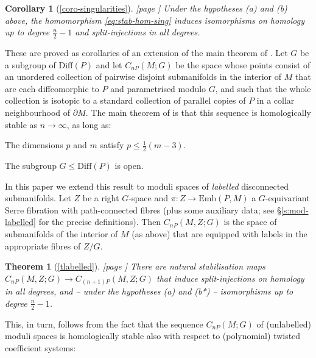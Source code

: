 \documentclass[reqno,a4paper]{article}
\numberwithin{equation}{section}
\theoremstyle{italicised}
\theoremstyle{upright}
\theoremstyle{italicised-restate}
\newtheorem{rthm}{Theorem}
\newtheorem{rcoro}{Corollary}
\newenvironment{itemizeb}%
{\begin{compactitem}
\renewcommand{\labelitemi}{\ensuremath{\bullet}}
\renewcommand{\labelitemii}{\ensuremath{\bullet}}}%
{\end{compactitem}}
\renewcommand{\leq}{\leqslant}
\begin{document}
\begin{rcoro}[\ref{coro-singularities}] \textup{[page \pageref{coro-singularities}]}
Under the hypotheses \textup{(a)} and \textup{(b)} above, the homomorphism \eqref{eq:stab-hom-sing} induces isomorphisms on homology up to degree $\tfrac{n}{2} - 1$ and split-injections in all degrees.
\end{rcoro}

These are proved as corollaries of an extension of the main theorem of \cite{Palmer2018HomologicalstabilitymoduliI}. Let $G$ be a subgroup of $\mathrm{Diff}(P)$ and let $C_{nP}(M;G)$ be the space whose points consist of an unordered collection of pairwise disjoint submanifolds in the interior of $M$ that are each diffeomorphic to $P$ and parametrised modulo $G$, and such that the whole collection is isotopic to a standard collection of parallel copies of $P$ in a collar neighbourhood of $\partial M$. The main theorem of \cite{Palmer2018HomologicalstabilitymoduliI} is that this sequence is homologically stable as $n\to\infty$, as long as:

\begin{itemizeb}
\item[(a)] The dimensions $p$ and $m$ satisfy $p \leq \tfrac12(m-3)$.
\item[(b*)] The subgroup $G \leq \mathrm{Diff}(P)$ is open.
\end{itemizeb}

In this paper we extend this result to moduli spaces of \emph{labelled} disconnected submanifolds. Let $Z$ be a right $G$-space and $\pi \colon Z \to \mathrm{Emb}(P,M)$ a $G$-equivariant Serre fibration with path-connected fibres (plus some auxiliary data; see \S\ref{s:mod-labelled} for the precise definitions). Then $C_{nP}(M,Z;G)$ is the space of submanifolds of the interior of $M$ (as above) that are equipped with labels in the appropriate fibres of $Z/G$.

\begin{rthm}[\ref{tlabelled}] \textup{[page \pageref{tlabelled}]}
There are natural stabilisation maps $C_{nP}(M,Z;G) \to C_{(n+1)P}(M,Z;G)$ that induce split-injections on homology in all degrees, and -- under the hypotheses \textup{(a)} and \textup{(b*)} -- isomorphisms up to degree $\tfrac{n}{2} - 1$.
\end{rthm}

This, in turn, follows from the fact that the sequence $C_{nP}(M;G)$ of (unlabelled) moduli spaces is homologically stable also with respect to (polynomial) twisted coefficient systems:
\end{document}
